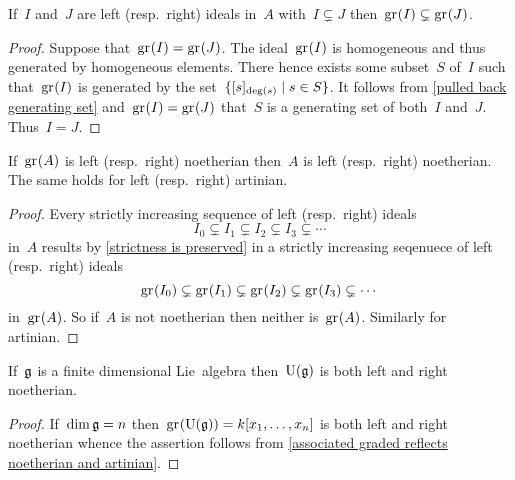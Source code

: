 \begin{corollary}
  \label{strictness is preserved}
  If~$I$ and~$J$ are left (resp.\ right) ideals in~$A$ with~$I \subsetneq J$ then~$\gr(I) \subsetneq \gr(J)$.
\end{corollary}

\begin{proof}
  Suppose that~$\gr(I) = \gr(J)$.
  The ideal~$\gr(I)$ is homogeneous and thus generated by homogeneous elements.
  There hence exists some subset~$S$ of~$I$ such that~$\gr(I)$ is generated by the set~$\{ [s]_{\deg(s)} \suchthat s \in S\}$.
  It follows from \cref{pulled back generating set} and~$\gr(I) = \gr(J)$ that~$S$ is a generating set of both~$I$ and~$J$.
  Thus~$I = J$.
\end{proof}

\begin{corollary}
  \label{associated graded reflects noetherian and artinian}
  If~$\gr(A)$ is left (resp.\ right) noetherian then~$A$ is left (resp.\ right) noetherian.
  The same holds for left (resp.\ right) artinian.
\end{corollary}

\begin{proof}
  Every strictly increasing sequence of left (resp.\ right) ideals
  \[
    I_0
    \subsetneq
    I_1
    \subsetneq
    I_2
    \subsetneq
    I_3
    \subsetneq
    \dotsb
  \]
  in~$A$ results by \cref{strictness is preserved} in a strictly increasing seqenuece of left (resp.\ right) ideals
  \[
    \gr(I_0)
    \subsetneq
    \gr(I_1)
    \subsetneq
    \gr(I_2)
    \subsetneq
    \gr(I_3)
    \subsetneq
    \dotsb
  \]
  in~$\gr(A)$.
  So if~$A$ is not noetherian then neither is~$\gr(A)$.
  Similarly for artinian.
\end{proof}

\begin{corollary}
  If~$\mathfrak{g}$ is a finite dimensional Lie~algebra then~$\operatorname{U}(\mathfrak{g})$ is both left and right noetherian.
\end{corollary}

\begin{proof}
  If~$\dim \mathfrak{g} = n$ then~$\gr(\Univ(\glie)) = k[x_1, \dotsc, x_n]$ is both left and right noetherian whence the assertion follows from \cref{associated graded reflects noetherian and artinian}.
\end{proof}

